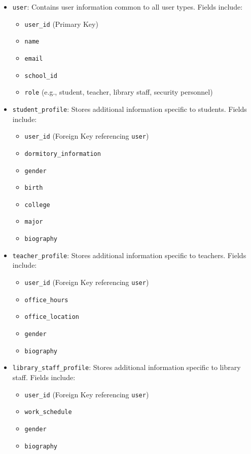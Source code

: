 \documentclass[12pt]{article}
\begin{document}
\begin{itemize}
    \item \texttt{user}: Contains user information common to all user types. Fields include:
    \begin{itemize}
        \item \texttt{user\_id} (Primary Key)
        \item \texttt{name}
        \item \texttt{email}
        \item \texttt{school\_id}
        \item \texttt{role} (e.g., student, teacher, library staff, security personnel)
    \end{itemize}
    
    \item \texttt{student\_profile}: Stores additional information specific to students. Fields include:
    \begin{itemize}
        \item \texttt{user\_id} (Foreign Key referencing \texttt{user})
        \item \texttt{dormitory\_information}
        \item \texttt{gender}
        \item \texttt{birth}
        \item \texttt{college}
        \item \texttt{major}
        \item \texttt{biography}
    \end{itemize}
    
    \item \texttt{teacher\_profile}: Stores additional information specific to teachers. Fields include:
    \begin{itemize}
        \item \texttt{user\_id} (Foreign Key referencing \texttt{user})
        \item \texttt{office\_hours}
        \item \texttt{office\_location}
        \item \texttt{gender}
        \item \texttt{biography}
    \end{itemize}
    
    \item \texttt{library\_staff\_profile}: Stores additional information specific to library staff. Fields include:
    \begin{itemize}
        \item \texttt{user\_id} (Foreign Key referencing \texttt{user})
        \item \texttt{work\_schedule}
        \item \texttt{gender}
        \item \texttt{biography}
    \end{itemize}


\end{itemize}
\end{document}
